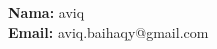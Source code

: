 \documentclass{article}
\begin{document}
\textbf{Nama:} aviq\\
\textbf{Email:} aviq.baihaqy@gmail.com\\
\end{document}
